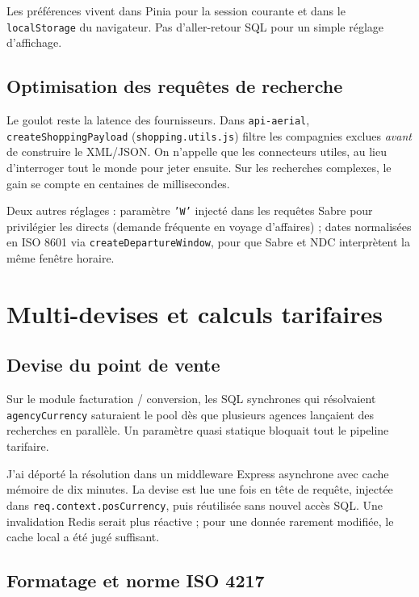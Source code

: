 Les préférences vivent dans Pinia pour la session courante et dans le \texttt{localStorage} du navigateur. Pas d'aller-retour SQL pour un simple réglage d'affichage.

\section{Optimisation des requêtes de recherche}

Le goulot reste la latence des fournisseurs. Dans \texttt{api-aerial}, \texttt{createShoppingPayload} (\texttt{shopping.utils.js}) filtre les compagnies exclues \emph{avant} de construire le XML/JSON. On n'appelle que les connecteurs utiles, au lieu d'interroger tout le monde pour jeter ensuite. Sur les recherches complexes, le gain se compte en centaines de millisecondes.

Deux autres réglages : paramètre \texttt{'W'} injecté dans les requêtes Sabre pour privilégier les directs (demande fréquente en voyage d'affaires) ; dates normalisées en ISO 8601 via \texttt{createDepartureWindow}, pour que Sabre et NDC interprètent la même fenêtre horaire.

\chapter{Multi-devises et calculs tarifaires}
\label{chap:architecture_financiere}

\section{Devise du point de vente}

Sur le module facturation / conversion, les SQL synchrones qui résolvaient \texttt{agencyCurrency} saturaient le pool dès que plusieurs agences lançaient des recherches en parallèle. Un paramètre quasi statique bloquait tout le pipeline tarifaire.

J'ai déporté la résolution dans un middleware Express asynchrone avec cache mémoire de dix minutes. La devise est lue une fois en tête de requête, injectée dans \texttt{req.context.posCurrency}, puis réutilisée sans nouvel accès SQL. Une invalidation Redis serait plus réactive ; pour une donnée rarement modifiée, le cache local a été jugé suffisant.

\section{Formatage et norme ISO 4217}

